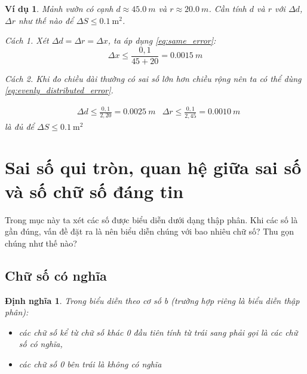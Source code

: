 \documentclass{book}    %
\newtheorem{definition}{Định nghĩa}
\newtheorem{exmp}{Ví dụ}[chapter]
\begin{document}
\begin{exmp}
    Mảnh vườn có cạnh \(d \approx \SI{45,0}{m}\) và \(r \approx \SI{20,0}{m}\).
    Cần tính \(d\) và \(r\) với \(\Delta d\), \(\Delta r\) như thế nào để
    \(\Delta S \leq \SI{0,1}{\m\squared}\).

    \emph{Cách 1.}
    Xét \(\Delta d = \Delta r = \Delta x\), ta áp dụng \ref{eq:same_error}:
    \begin{equation*}
        \Delta x \leq \frac{0,1}{45 + 20} = \SI{0,0015}{m}
    \end{equation*}

    \emph{Cách 2.}
    Khi đo chiều dài thường có sai số lớn hơn chiều rộng nên ta có thể dùng
    \ref{eq:evenly_distributed_error}.

    \begin{equation*}
        \begin{aligned}
            &\Delta d \leq \frac{0,1}{2,20} = \SI{0,0025}{m}
            &\Delta r \leq \frac{0,1}{2,45} = \SI{0,0010}{m}
        \end{aligned}
    \end{equation*}
    là đủ để \(\Delta S \leq \SI{0,1}{\m\squared}\)
\end{exmp}

\section[Sai số quy tròn, quan hệ sai số \& số chữ số chắc]{Sai số qui tròn, quan hệ giữa sai số và số chữ số đáng tin}

Trong mục này ta xét các số được biểu diễn dưới dạng thập phân. Khi các số là
gần đúng, vấn đề đặt ra là nên biểu diễn chúng với bao nhiêu chữ số? Thu gọn
chúng như thế nào?

\subsection{Chữ số có nghĩa}

\begin{definition}
    Trong biểu diễn theo cơ số b (trường hợp riêng là biểu diễn thập phân):
    \begin{itemize}
        \item các chữ số kể từ chữ số khác 0 đầu tiên tính từ trái sang phải gọi
            là \emph{các chữ số có nghĩa},
        \item các chữ số 0 bên trái là \emph{không có nghĩa}
    \end{itemize}
\end{definition}
\end{document}
